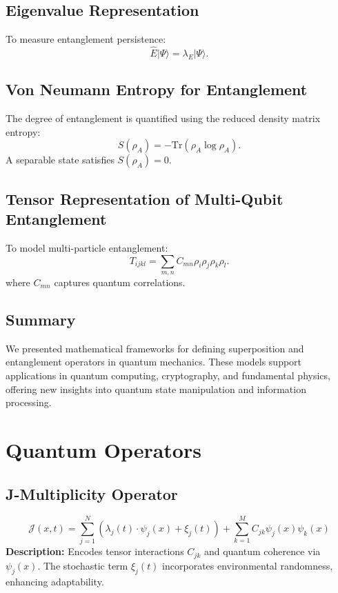 \documentclass{article}
\theoremstyle{plain}
\begin{document}
\begin{itemize}
\subsection{Eigenvalue Representation}
To measure entanglement persistence:
\begin{equation}
    \hat{E} |\Psi\rangle = \lambda_E |\Psi\rangle.
\end{equation}

\subsection{Von Neumann Entropy for Entanglement}
The degree of entanglement is quantified using the reduced density matrix entropy:
\begin{equation}
    S(\rho_A) = - \text{Tr}(\rho_A \log \rho_A).
\end{equation}
A separable state satisfies $S(\rho_A) = 0$.

\subsection{Tensor Representation of Multi-Qubit Entanglement}
To model multi-particle entanglement:
\begin{equation}
    T_{ijkl} = \sum_{m,n} C_{mn} \rho_i \rho_j \rho_k \rho_l.
\end{equation}
where $C_{mn}$ captures quantum correlations.

\subsection{Summary}
We presented mathematical frameworks for defining superposition and entanglement operators in quantum mechanics. These models support applications in quantum computing, cryptography, and fundamental physics, offering new insights into quantum state manipulation and information processing.

\section{Quantum Operators}
\subsection{J-Multiplicity Operator}
\[
\mathcal{J}(x, t) = \sum_{j=1}^N \left( \lambda_j(t) \cdot \psi_j(x) + \xi_j(t) \right) + \sum_{k=1}^M C_{jk} \psi_j(x) \psi_k(x)
\]
\textbf{Description:} Encodes tensor interactions $C_{jk}$ and quantum coherence via $\psi_j(x)$. The stochastic term $\xi_j(t)$ incorporates environmental randomness, enhancing adaptability.

\end{itemize}
\end{document}
